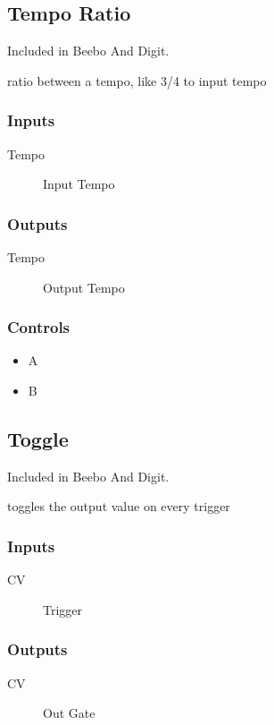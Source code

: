\subsection{Tempo Ratio}

Included in Beebo And Digit.

ratio between a tempo, like 3/4 to input tempo



\subsubsection{Inputs}
\begin{description}
\item [Tempo] Input Tempo
\end{description}

\subsubsection{Outputs}
\begin{description}
\item [Tempo] Output Tempo
\end{description}

\subsubsection{Controls}
\begin{itemize}
\item A
\item B
\end{itemize}

\subsection{Toggle}

Included in Beebo And Digit.

toggles the output value on every trigger



\subsubsection{Inputs}
\begin{description}
\item [CV] Trigger
\end{description}

\subsubsection{Outputs}
\begin{description}
\item [CV] Out Gate
\end{description}

